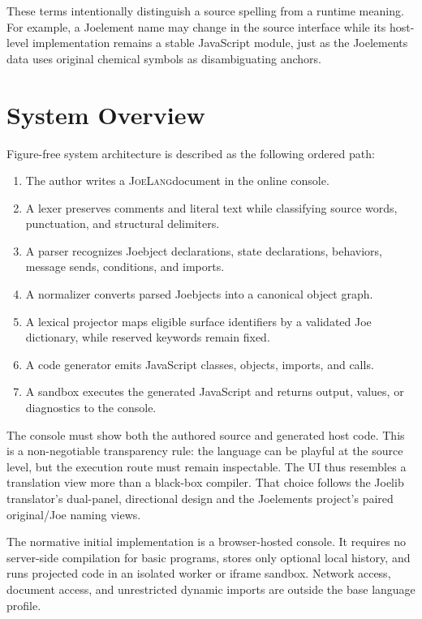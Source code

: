 \documentclass[12pt]{article}
\newcommand{\JoeLang}{\textsc{JoeLang}}
\begin{document}
These terms intentionally distinguish a source spelling from a runtime meaning. For example, a Joelement name may change in the source interface while its host-level implementation remains a stable JavaScript module, just as the Joelements data uses original chemical symbols as disambiguating anchors.\cite{joelements}

\clearpage
\section{System Overview}
Figure-free system architecture is described as the following ordered path:

\begin{enumerate}
  \item The author writes a \JoeLang document in the online console.
  \item A lexer preserves comments and literal text while classifying source words, punctuation, and structural delimiters.
  \item A parser recognizes Joebject declarations, state declarations, behaviors, message sends, conditions, and imports.
  \item A normalizer converts parsed Joebjects into a canonical object graph.
  \item A lexical projector maps eligible surface identifiers by a validated Joe dictionary, while reserved keywords remain fixed.
  \item A code generator emits JavaScript classes, objects, imports, and calls.
  \item A sandbox executes the generated JavaScript and returns output, values, or diagnostics to the console.
\end{enumerate}

The console must show both the authored source and generated host code. This is a non-negotiable transparency rule: the language can be playful at the source level, but the execution route must remain inspectable. The UI thus resembles a translation view more than a black-box compiler. That choice follows the Joelib translator's dual-panel, directional design and the Joelements project's paired original/Joe naming views.\cite{translatorReadme,joelements}

The normative initial implementation is a browser-hosted console. It requires no server-side compilation for basic programs, stores only optional local history, and runs projected code in an isolated worker or iframe sandbox. Network access, document access, and unrestricted dynamic imports are outside the base language profile.
\end{document}

